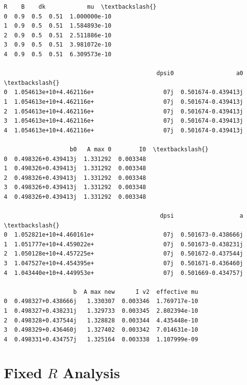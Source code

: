 \documentclass[11pt]{article}
\makeatletter
\newcommand{\boxspacing}{\kern\kvtcb@left@rule\kern\kvtcb@boxsep}
\newcommand{\prompt}[4]{
        {\ttfamily\llap{{\color{#2}[#3]:\hspace{3pt}#4}}\vspace{-\baselineskip}}
    }
\makeatother
\begin{document}
            \begin{tcolorbox}[breakable, size=fbox, boxrule=.5pt, pad at break*=1mm, opacityfill=0]
\prompt{Out}{outcolor}{11}{\boxspacing}
\begin{Verbatim}[commandchars=\\\{\}]
     R    B    dk            mu  \textbackslash{}
0  0.9  0.5  0.51  1.000000e-10
1  0.9  0.5  0.51  1.584893e-10
2  0.9  0.5  0.51  2.511886e-10
3  0.9  0.5  0.51  3.981072e-10
4  0.9  0.5  0.51  6.309573e-10

                                            dpsi0                  a0  \textbackslash{}
0  1.054613e+10+4.462116e+                    07j  0.501674-0.439413j
1  1.054613e+10+4.462116e+                    07j  0.501674-0.439413j
2  1.054613e+10+4.462116e+                    07j  0.501674-0.439413j
3  1.054613e+10+4.462116e+                    07j  0.501674-0.439413j
4  1.054613e+10+4.462116e+                    07j  0.501674-0.439413j

                   b0   A max 0        I0  \textbackslash{}
0  0.498326+0.439413j  1.331292  0.003348
1  0.498326+0.439413j  1.331292  0.003348
2  0.498326+0.439413j  1.331292  0.003348
3  0.498326+0.439413j  1.331292  0.003348
4  0.498326+0.439413j  1.331292  0.003348

                                             dpsi                   a  \textbackslash{}
0  1.052821e+10+4.460161e+                    07j  0.501673-0.438666j
1  1.051777e+10+4.459022e+                    07j  0.501673-0.438231j
2  1.050128e+10+4.457225e+                    07j  0.501672-0.437544j
3  1.047527e+10+4.454395e+                    07j  0.501671-0.436460j
4  1.043440e+10+4.449953e+                    07j  0.501669-0.434757j

                    b  A max new      I v2  effective mu
0  0.498327+0.438666j   1.330307  0.003346  1.769717e-10
1  0.498327+0.438231j   1.329733  0.003345  2.802394e-10
2  0.498328+0.437544j   1.328828  0.003344  4.435448e-10
3  0.498329+0.436460j   1.327402  0.003342  7.014631e-10
4  0.498331+0.434757j   1.325164  0.003338  1.107999e-09
\end{Verbatim}
\end{tcolorbox}
        
    \hypertarget{fixed-r-analysis}{%
\section{\texorpdfstring{Fixed \(R\)
Analysis}{Fixed R Analysis}}\label{fixed-r-analysis}}
\end{document}

